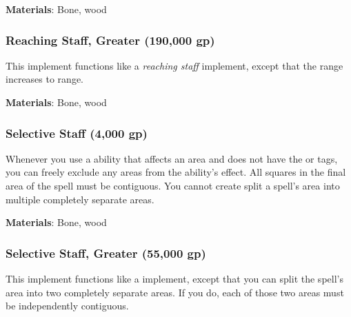 \vspace{0.25em}
\textbf{Materials}: Bone, wood


\lowercase{\hypertarget{item:Reaching Staff, Greater}{}}\label{item:Reaching Staff, Greater}
\hypertarget{item:Reaching Staff, Greater}{\subsubsection{Reaching Staff, Greater\hfill{} (190,000 gp)}}

This implement functions like a \textit{reaching staff} implement, except that the range increases to \rngmed range.



\vspace{0.25em}
\textbf{Materials}: Bone, wood


\lowercase{\hypertarget{item:Selective Staff}{}}\label{item:Selective Staff}
\hypertarget{item:Selective Staff}{\subsubsection{Selective Staff\hfill{} (4,000 gp)}}

Whenever you use a  ability that affects an area and does not have the  or  tags, you can freely exclude any areas from the ability's effect.
All squares in the final area of the spell must be contiguous.
You cannot create split a spell's area into multiple completely separate areas.



\vspace{0.25em}
\textbf{Materials}: Bone, wood


\lowercase{\hypertarget{item:Selective Staff, Greater}{}}\label{item:Selective Staff, Greater}
\hypertarget{item:Selective Staff, Greater}{\subsubsection{Selective Staff, Greater\hfill{} (55,000 gp)}}

This implement functions like a  implement, except that you can split the spell's area into two completely separate areas.
If you do, each of those two areas must be independently contiguous.



